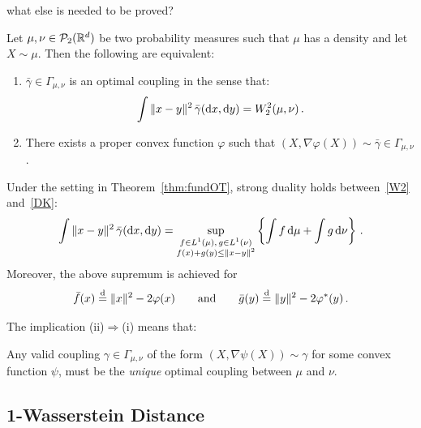 {\blue what else is needed to be proved?}

\begin{theorem}\label{thm:fundOT}
Let $\mu, \nu \in \mathcal{P}_2(\mathbb{R}^d)$ be two probability measures such that $\mu$ has a density and let $X \sim \mu$. Then the following are equivalent:
\begin{enumerate}[label=(\roman*)]
\item $\bar \gamma \in \Gamma_{\mu,\nu}$ is an optimal coupling in the sense that:
$$
\int \|x-y\|^2 \,\bar \gamma(\mathrm{d} x,\mathrm{d} y)=W_2^2(\mu, \nu)\,.
$$
\item There exists a proper convex function $\varphi$ such that $(X, \nabla \varphi(X))\sim \bar \gamma \in \Gamma_{\mu, \nu}$.
\end{enumerate}
\end{theorem}
\begin{corollary}
    Under the setting in Theorem~\ref{thm:fundOT}, strong duality holds between~\eqref{W2} and~\eqref{DK}:
$$
\int \|x-y\|^2 \,\bar \gamma(\mathrm{d} x,\mathrm{d} y) = \sup_{\substack{ f \in L^1(\mu), \,g\in L^1(\nu)\\f(x) +g(y)\le \|x-y\|^2} }\left\{\int f \,\mathrm{d} \mu + \int g\, \mathrm{d} \nu\right\}\,.
$$
Moreover, the above supremum is achieved for 
$$
\bar f(x) \overset{\mathrm{d}}{=} \|x\|^2-2\varphi(x)\qquad \text{and} \qquad \bar g(y) \overset{\mathrm{d}}{=} \|y\|^2-2\varphi^*(y)\,.
$$
\end{corollary}


The implication (ii)$\Longrightarrow$(i) means that:
\begin{corollary}
    Any valid coupling $\gamma \in \Gamma_{\mu, \nu}$ of the form $(X, \nabla \psi(X))\sim \gamma$ for some convex function $\psi$, must be the \emph{unique} optimal coupling between $\mu$ and $\nu$. 
\end{corollary}

\begin{example}
    
\end{example}

\begin{example}
    
\end{example}

\subsection{1-Wasserstein Distance}

